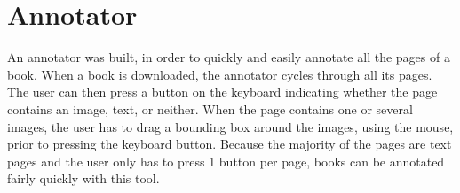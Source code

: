\section{Annotator}
\label{sec:annotator}

An annotator was built, in order to quickly and easily annotate all the pages of
a book. When a book is downloaded, the annotator cycles through all its pages.
The user can then press a button on the keyboard indicating whether the page
contains an image, text, or neither. When the page contains one or several
images, the user has to drag a bounding box around the images, using the mouse,
prior to pressing the keyboard button. Because the majority of the pages are
text pages and the user only has to press 1 button per page, books can be
annotated fairly quickly with this tool.
